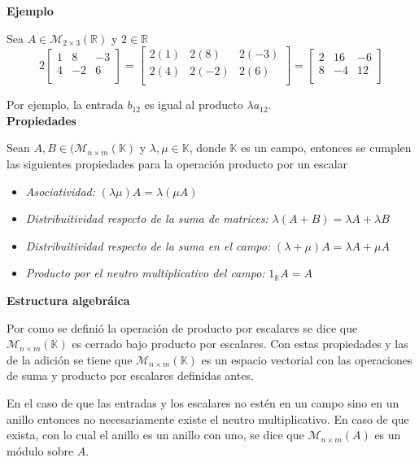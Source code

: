 \noindent\textbf{Ejemplo} 

Sea $A \in \mathcal{M}_{2\times {3}}(\mathbb{R})$ y $2 \in \mathbb{R}$
$$
2
\begin{bmatrix}
1 & 8 & -3 \\
4 & -2 & 6 \\
\end{bmatrix}
=
\begin{bmatrix}
2(1) & 2(8) & 2(-3) \\
2(4) & 2(-2) & 2(6) \\
\end{bmatrix}
=
\begin{bmatrix}
2 & 16 & -6 \\
8 & -4 & 12 \\
\end{bmatrix}
$$

Por ejemplo, la entrada $b_{12}$ es igual al producto $\lambda a_{12}$. \\

\noindent\textbf{Propiedades}


Sean $A,B \in (\mathcal{M}_{n\times {m}}(\mathbb{K})$ y $\lambda, \mu \in \mathbb{K}$, donde $\mathbb{K}$ es un campo, entonces se cumplen las siguientes propiedades para la operación producto por un escalar

\begin{itemize}
\item \textit{Asociatividad:} $(\lambda \mu)A = \lambda(\mu A)$
\item \textit{Distribuitividad respecto de la suma de matrices:} $\lambda(A+B) = \lambda A + \lambda B$
\item \textit{Distribuitividad respecto de la suma en el campo:} $(\lambda + \mu)A = \lambda A + \mu A$
\item \textit{Producto por el neutro multiplicativo del campo:} $1_{\mathbb{K}}A = A$
\end{itemize}

\noindent\textbf{Estructura algebráica}


Por como se definió la operación de producto por escalares se dice que $\mathcal{M}_{n\times {m}}(\mathbb{K})$ es cerrado bajo producto por escalares. Con estas propiedades y las de la adición se tiene que $\mathcal{M}_{n\times {m}}(\mathbb{K})$ es un espacio vectorial con las operaciones de suma y producto por escalares definidas antes.

En el caso de que las entradas y los escalares no estén en un campo sino en un anillo entonces no necesariamente existe el neutro multiplicativo. En caso de que exista, con lo cual el anillo es un anillo con uno, se dice que $\mathcal{M}_{n\times {m}}(A)$ es un módulo sobre $A$. \\

